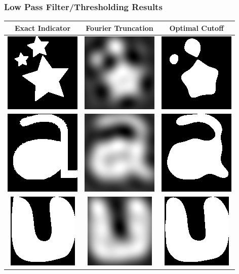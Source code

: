 \documentclass{beamer}
\begin{document}
\begin{frame}
\frametitle{Low Pass Filter/Thresholding Results}
\begin{center}
\centering
\begin{tabular}{|c|c|c|}
\hline
Exact Indicator & 
Fourier Truncation & 
Optimal Cutoff \\
\hline
\includegraphics[height=.5in]{figures/fig_ind0.png} & 
\includegraphics[height=.5in]{figures/fig_ift0.png} & 
\includegraphics[height=.5in]{figures/fig_cut0.png} \\
\hline
\includegraphics[height=.5in]{figures/fig_ind1.png} & 
\includegraphics[height=.5in]{figures/fig_ift1.png} & 
\includegraphics[height=.5in]{figures/fig_cut1.png} \\
\hline
\includegraphics[height=.5in]{figures/fig_ind2.png} & 
\includegraphics[height=.5in]{figures/fig_ift2.png} & 
\includegraphics[height=.5in]{figures/fig_cut2.png} \\

\end{tabular}
\end{center}
\end{frame}
\end{document}
